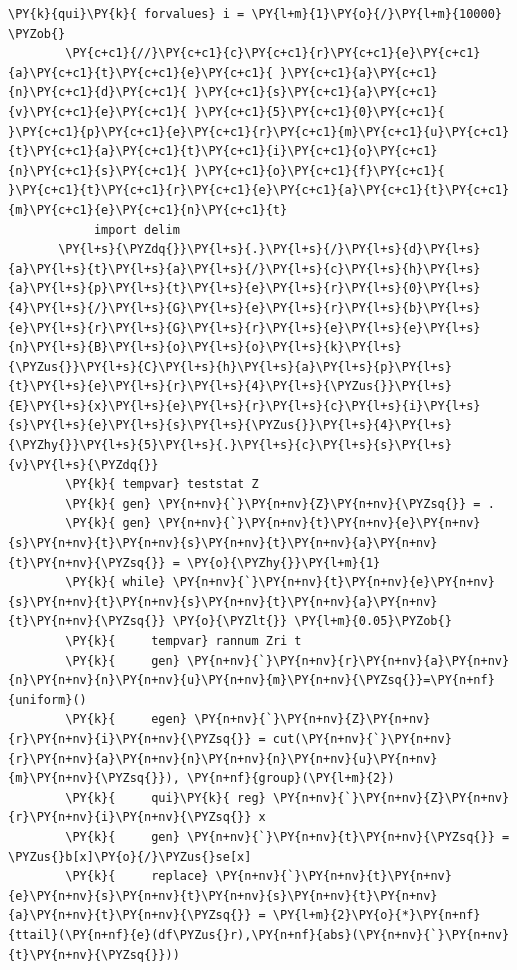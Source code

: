 \documentclass[11pt,notitlepage]{article}\usepackage[]{graphicx}\usepackage[]{color}
\makeatletter
\newenvironment{kframe}{%
 \def\at@end@of@kframe{}%
 \ifinner\ifhmode%
  \def\at@end@of@kframe{\end{minipage}}%
  \begin{minipage}{\columnwidth}%
 \fi\fi%
 \def\FrameCommand##1{\hskip\@totalleftmargin \hskip-\fboxsep
 \colorbox{shadecolor}{##1}\hskip-\fboxsep
     \hskip-\linewidth \hskip-\@totalleftmargin \hskip\columnwidth}%
 \MakeFramed {\advance\hsize-\width
   \@totalleftmargin\z@ \linewidth\hsize
   \@setminipage}}%
 {\par\unskip\endMakeFramed%
 \at@end@of@kframe}
\newenvironment{knitrout}{}{} %
\makeatother
\begin{document}
\begin{enumerate}[a)]
\begin{knitrout}
\begin{kframe}
\begin{Verbatim}[commandchars=\\\{\}]
        \PY{k}{qui}\PY{k}{ forvalues} i = \PY{l+m}{1}\PY{o}{/}\PY{l+m}{10000} \PYZob{}
        \PY{c+c1}{//}\PY{c+c1}{c}\PY{c+c1}{r}\PY{c+c1}{e}\PY{c+c1}{a}\PY{c+c1}{t}\PY{c+c1}{e}\PY{c+c1}{ }\PY{c+c1}{a}\PY{c+c1}{n}\PY{c+c1}{d}\PY{c+c1}{ }\PY{c+c1}{s}\PY{c+c1}{a}\PY{c+c1}{v}\PY{c+c1}{e}\PY{c+c1}{ }\PY{c+c1}{5}\PY{c+c1}{0}\PY{c+c1}{ }\PY{c+c1}{p}\PY{c+c1}{e}\PY{c+c1}{r}\PY{c+c1}{m}\PY{c+c1}{u}\PY{c+c1}{t}\PY{c+c1}{a}\PY{c+c1}{t}\PY{c+c1}{i}\PY{c+c1}{o}\PY{c+c1}{n}\PY{c+c1}{s}\PY{c+c1}{ }\PY{c+c1}{o}\PY{c+c1}{f}\PY{c+c1}{ }\PY{c+c1}{t}\PY{c+c1}{r}\PY{c+c1}{e}\PY{c+c1}{a}\PY{c+c1}{t}\PY{c+c1}{m}\PY{c+c1}{e}\PY{c+c1}{n}\PY{c+c1}{t}
        	import delim 
       \PY{l+s}{\PYZdq{}}\PY{l+s}{.}\PY{l+s}{/}\PY{l+s}{d}\PY{l+s}{a}\PY{l+s}{t}\PY{l+s}{a}\PY{l+s}{/}\PY{l+s}{c}\PY{l+s}{h}\PY{l+s}{a}\PY{l+s}{p}\PY{l+s}{t}\PY{l+s}{e}\PY{l+s}{r}\PY{l+s}{0}\PY{l+s}{4}\PY{l+s}{/}\PY{l+s}{G}\PY{l+s}{e}\PY{l+s}{r}\PY{l+s}{b}\PY{l+s}{e}\PY{l+s}{r}\PY{l+s}{G}\PY{l+s}{r}\PY{l+s}{e}\PY{l+s}{e}\PY{l+s}{n}\PY{l+s}{B}\PY{l+s}{o}\PY{l+s}{o}\PY{l+s}{k}\PY{l+s}{\PYZus{}}\PY{l+s}{C}\PY{l+s}{h}\PY{l+s}{a}\PY{l+s}{p}\PY{l+s}{t}\PY{l+s}{e}\PY{l+s}{r}\PY{l+s}{4}\PY{l+s}{\PYZus{}}\PY{l+s}{E}\PY{l+s}{x}\PY{l+s}{e}\PY{l+s}{r}\PY{l+s}{c}\PY{l+s}{i}\PY{l+s}{s}\PY{l+s}{e}\PY{l+s}{s}\PY{l+s}{\PYZus{}}\PY{l+s}{4}\PY{l+s}{\PYZhy{}}\PY{l+s}{5}\PY{l+s}{.}\PY{l+s}{c}\PY{l+s}{s}\PY{l+s}{v}\PY{l+s}{\PYZdq{}}
        \PY{k}{	tempvar} teststat Z
        \PY{k}{	gen} \PY{n+nv}{`}\PY{n+nv}{Z}\PY{n+nv}{\PYZsq{}} = .
        \PY{k}{	gen} \PY{n+nv}{`}\PY{n+nv}{t}\PY{n+nv}{e}\PY{n+nv}{s}\PY{n+nv}{t}\PY{n+nv}{s}\PY{n+nv}{t}\PY{n+nv}{a}\PY{n+nv}{t}\PY{n+nv}{\PYZsq{}} = \PY{o}{\PYZhy{}}\PY{l+m}{1}
        \PY{k}{	while} \PY{n+nv}{`}\PY{n+nv}{t}\PY{n+nv}{e}\PY{n+nv}{s}\PY{n+nv}{t}\PY{n+nv}{s}\PY{n+nv}{t}\PY{n+nv}{a}\PY{n+nv}{t}\PY{n+nv}{\PYZsq{}} \PY{o}{\PYZlt{}} \PY{l+m}{0.05}\PYZob{}
        \PY{k}{		tempvar} rannum Zri t
        \PY{k}{	    gen} \PY{n+nv}{`}\PY{n+nv}{r}\PY{n+nv}{a}\PY{n+nv}{n}\PY{n+nv}{n}\PY{n+nv}{u}\PY{n+nv}{m}\PY{n+nv}{\PYZsq{}}=\PY{n+nf}{uniform}()
        \PY{k}{		egen} \PY{n+nv}{`}\PY{n+nv}{Z}\PY{n+nv}{r}\PY{n+nv}{i}\PY{n+nv}{\PYZsq{}} = cut(\PY{n+nv}{`}\PY{n+nv}{r}\PY{n+nv}{a}\PY{n+nv}{n}\PY{n+nv}{n}\PY{n+nv}{u}\PY{n+nv}{m}\PY{n+nv}{\PYZsq{}}), \PY{n+nf}{group}(\PY{l+m}{2})
        \PY{k}{		qui}\PY{k}{ reg} \PY{n+nv}{`}\PY{n+nv}{Z}\PY{n+nv}{r}\PY{n+nv}{i}\PY{n+nv}{\PYZsq{}} x
        \PY{k}{		gen} \PY{n+nv}{`}\PY{n+nv}{t}\PY{n+nv}{\PYZsq{}} = \PYZus{}b[x]\PY{o}{/}\PYZus{}se[x]		
        \PY{k}{		replace} \PY{n+nv}{`}\PY{n+nv}{t}\PY{n+nv}{e}\PY{n+nv}{s}\PY{n+nv}{t}\PY{n+nv}{s}\PY{n+nv}{t}\PY{n+nv}{a}\PY{n+nv}{t}\PY{n+nv}{\PYZsq{}} = \PY{l+m}{2}\PY{o}{*}\PY{n+nf}{ttail}(\PY{n+nf}{e}(df\PYZus{}r),\PY{n+nf}{abs}(\PY{n+nv}{`}\PY{n+nv}{t}\PY{n+nv}{\PYZsq{}}))	

\end{Verbatim}
\end{kframe}
\end{knitrout}
\end{enumerate}
\end{document}
